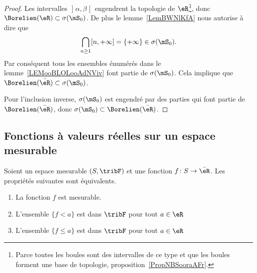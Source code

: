 \begin{proof}
Les intervalles \( \mathopen] \alpha , \beta \mathclose[\) engendrent la topologie de \( \eR\)\footnote{Parce toutes les boules sont des intervalles de ce type et que les boules forment une base de topologie, proposition~\ref{PropNBSooraAFr}.}, donc \( \Borelien(\eR)\subset\sigma(\mS_0)\). De plus le lemme~\ref{LemBWNlKfA} nous autorise à dire que
    \begin{equation}
        \bigcap_{n\geq 1}\mathopen[ n , +\infty \mathclose]=\{ +\infty \}\in\sigma(\mS_0).
    \end{equation}
    Par conséquent tous les ensembles énumérés dans le lemme~\ref{LEMooBLOLooAdNViv} font partie de \( \sigma(\mS_0)\). Cela implique que \( \Borelien(\bar\eR)\subset\sigma(\mS_0)\).

    Pour l'inclusion inverse, \( \sigma(\mS_0)\) est engendré par des parties qui font partie de \( \Borelien(\bar \eR)\), donc \( \sigma(\mS_0)\subset\Borelien(\bar \eR)\).
\end{proof}

\subsection{Fonctions à valeurs réelles sur un espace mesurable}

\begin{theorem}     \label{THOooWHFLooKYGsOm}
    Soient un espace mesurable \( (S,\tribF)\) et une fonction \( f\colon S\to \bar \eR\). Les propriétés suivantes sont équivalents.
    \begin{enumerate}
        \item\label{ITEMooHAMHooYLqUhVi}
            La fonction \( f\) est mesurable.
        \item\label{ITEMooHAMHooYLqUhVii}
            L'ensemble \( \{ f<a \}\) est dans \( \tribF\) pour tout \( a\in \eR\)
        \item\label{ITEMooHAMHooYLqUhViii}
            L'ensemble \( \{ f\leq a \}\) est dans \( \tribF\) pour tout \( a\in \eR\)
    \end{enumerate}
\end{theorem}

